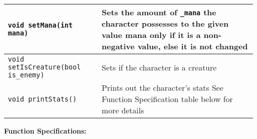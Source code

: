 \begin{longtable}{|p{2.0in}|p{4.0in}|}
\texttt{void setMana(int mana)} & Sets the amount of \texttt{_mana} the character possesses to the given value mana only if it is a non-negative value, else it is not changed \\ \hline

\texttt{void setIsCreature(bool} \newline \texttt{is_enemy)} & Sets if the character is a creature \\ \hline

\texttt{void printStats()} & Prints out the character's stats
See Function Specification table below for more details
 \\ \hline

\end{longtable}

\textbf{Function Specifications:}


